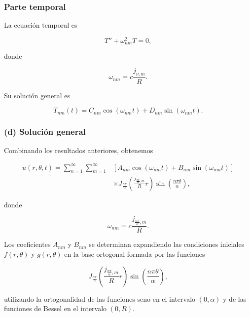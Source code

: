 \documentclass[12pt]{article}
\begin{document}
\subsubsection*{Parte temporal}

La ecuación temporal es

\begin{equation}
T''+\omega_{nm}^2T=0,
\end{equation}

donde

\begin{equation}
\boxed{
\omega_{nm}
=
c
\frac{j_{\nu,m}}{R}.
}
\end{equation}

Su solución general es

\begin{equation}
T_{nm}(t)
=
C_{nm}\cos(\omega_{nm}t)
+
D_{nm}\sin(\omega_{nm}t).
\end{equation}

\subsubsection*{(d) Solución general}

Combinando los resultados anteriores, obtenemos

\begin{equation}
\boxed{
\begin{aligned}
u(r,\theta,t)
=
\sum_{n=1}^{\infty}
\sum_{m=1}^{\infty}
&
\left[
A_{nm}\cos(\omega_{nm}t)
+
B_{nm}\sin(\omega_{nm}t)
\right]
\\
&\times
J_{\frac{n\pi}{\alpha}}
\left(
\frac{j_{\frac{n\pi}{\alpha},m}}{R}r
\right)
\sin
\left(
\frac{n\pi\theta}{\alpha}
\right),
\end{aligned}
}
\end{equation}

donde

\begin{equation}
\omega_{nm}
=
c
\frac{j_{\frac{n\pi}{\alpha},m}}{R}.
\end{equation}

Los coeficientes $A_{nm}$ y $B_{nm}$ se determinan expandiendo las condiciones iniciales $f(r,\theta)$ y $g(r,\theta)$ en la base ortogonal formada por las funciones

\[
J_{\frac{n\pi}{\alpha}}
\left(
\frac{j_{\frac{n\pi}{\alpha},m}}{R}r
\right)
\sin
\left(
\frac{n\pi\theta}{\alpha}
\right),
\]

utilizando la ortogonalidad de las funciones seno en el intervalo $(0,\alpha)$ y de las funciones de Bessel en el intervalo $(0,R)$.
\end{document}

